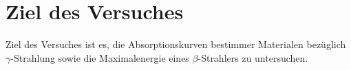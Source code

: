 \section{Ziel des Versuches}

Ziel des Versuches ist es, die Absorptionskurven bestimmer Materialen bezüglich $\gamma$-Strahlung sowie die Maximalenergie
eines $\beta$-Strahlers zu untersuchen. 